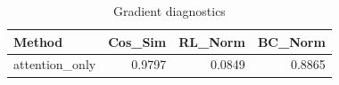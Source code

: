 \begin{table}[htbp]
\centering
\caption{Gradient diagnostics}
\label{tab:grad-diag}
\begin{tabular}{lrrr}
\toprule
\textbf{Method} & \textbf{Cos\_Sim} & \textbf{RL\_Norm} & \textbf{BC\_Norm} \\
\midrule
attention\_only & 0.9797 & 0.0849 & 0.8865 \\
\bottomrule
\end{tabular}
\end{table}